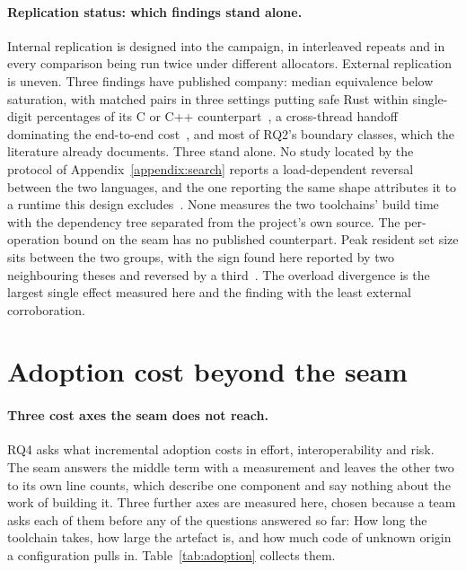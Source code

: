 \documentclass[english,oneside,a4paper,censored,csm,software-track-2020]{HYthesisML}
\begin{document}
\begin{appendices}
\paragraph{Replication status: which findings stand alone.}
Internal replication is designed into the campaign, in \NRepeats{} interleaved repeats and in
every comparison being run twice under different allocators. External replication is uneven. Three
findings have published company: median equivalence below saturation, with matched pairs in three
settings putting safe Rust within single-digit percentages of its C or C++
counterpart~\cite{emmerich2019drivers,li2021ipc,gonzalez2023rustudp}, a cross-thread handoff
dominating the end-to-end cost~\cite{zhou2025oltp}, and most of RQ2's boundary classes, which the
literature already documents. Three stand alone. No study located by the protocol of
Appendix~\ref{appendix:search} reports a load-dependent reversal between the two languages, and the
one reporting the same shape attributes it to a runtime this design
excludes~\cite{arvidsson2025async}. None measures the two toolchains' build time with the
dependency tree separated from the project's own source. The per-operation bound on the seam has
no published counterpart. Peak resident set size sits between the two groups, with the sign found
here reported by two neighbouring theses and reversed by a
third~\cite{olsson2023ranmgmt,sundvisson2026drivers,karlback2021ran}. The overload divergence is
the largest single effect measured here and the finding with the least external corroboration.


\section{Adoption cost beyond the seam\label{appendix:adoption}}
\paragraph{Three cost axes the seam does not reach.}
RQ4 asks what incremental adoption costs in effort, interoperability and risk. The seam answers
the middle term with a measurement and leaves the other two to its own line counts, which describe
one component and say nothing about the work of building it. Three further axes are measured here,
chosen because a team asks each of them before any of the questions answered so far: How long the
toolchain takes, how large the artefact is, and how much code of unknown origin a configuration
pulls in. Table~\ref{tab:adoption} collects them.


\end{appendices}
\end{document}
